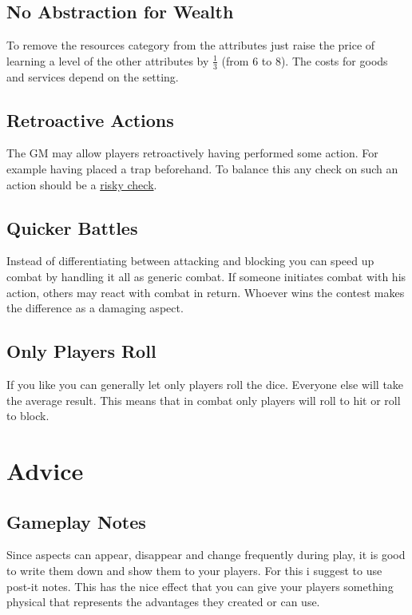 \documentclass[11pt]{article}
\begin{document}
{\subsection{No Abstraction for Wealth}
\label{sec:org5c3b545}

To remove the resources category from the attributes just raise the price of learning a level of the other attributes by \(\frac{1}{3}\) (from 6 to 8). The costs for goods and services
depend on the setting.
\subsection{Retroactive Actions}
\label{sec:orgda752ac}

The GM may allow players retroactively having performed some action. For example having placed a trap beforehand. To balance this any check on such an action should be a \hyperref[sec:orgc05fe30]{risky check}.
\subsection{Quicker Battles}
\label{sec:org21255bc}

Instead of differentiating between attacking and blocking you can speed up combat by handling it all as generic combat. If someone initiates combat with his action, others may react with combat in return. Whoever wins the contest makes the difference as a damaging aspect.
\subsection{Only Players Roll}
\label{sec:org36bda7b}
If you like you can generally let only players roll the dice. Everyone else will take the average result. This means that in combat only players will roll to hit or roll to block.
\section{Advice}
\label{sec:org25368ad}
\subsection{Gameplay Notes}
\label{sec:org8e7a680}

Since aspects can appear, disappear and change frequently during play, it is good to write them down and show them to your players. For this i suggest to use post-it notes. This has the nice effect that you can give your players something physical that represents the advantages they created or can use.
}
\end{document}
